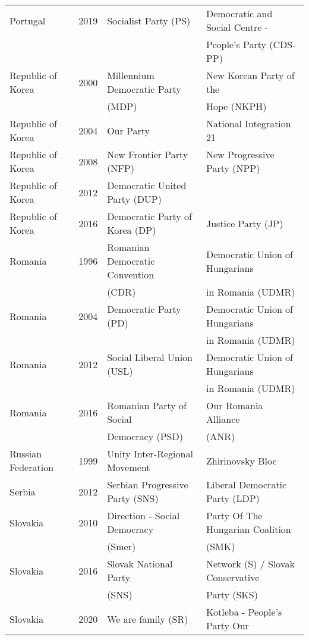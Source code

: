 {\begin{longtable}{|l|c|l|l|}
Portugal & 2019 &   Socialist Party (PS) &   Democratic and Social Centre - \\ 
               &      &         &   People's Party (CDS-PP)   \\ 
Republic of Korea & 2000 &   Millennium Democratic Party  &   New Korean Party of the \\ 
               &      &      (MDP)   &   Hope (NKPH)   \\ 
   Republic of Korea & 2004 &   Our Party &   National Integration 21 \\ 
   Republic of Korea & 2008 &   New Frontier Party (NFP)   &   New Progressive Party (NPP) \\ 
   Republic of Korea & 2012 &   Democratic United Party (DUP) &  \\ 
   Republic of Korea & 2016 &   Democratic Party of Korea (DP) &   Justice Party (JP) \\ 
   Romania & 1996 &   Romanian Democratic Convention  &   Democratic Union of Hungarians  \\ 
               &      &      (CDR)     &   in Romania (UDMR)  \\ 
   Romania & 2004 &   Democratic Party (PD) &   Democratic Union of Hungarians  \\ 
               &      &         &    in Romania (UDMR) \\ 
   Romania & 2012 &   Social Liberal Union (USL)   &   Democratic Union of Hungarians \\ 
               &      &         &   in Romania (UDMR)   \\ 
   Romania & 2016 &   Romanian Party of Social   &   Our Romania Alliance  \\ 
               &      &      Democracy (PSD)    &   (ANR)  \\ 
Russian Federation & 1999 &   Unity Inter-Regional Movement &   Zhirinovsky Bloc \\ 
 Serbia & 2012 &   Serbian Progressive Party (SNS)   &   Liberal Democratic Party (LDP)   \\ 
Slovakia & 2010 &   Direction - Social Democracy &   Party Of The Hungarian Coalition  \\ 
               &      &      (Smer)    &    (SMK) \\ 
   Slovakia & 2016 &   Slovak National Party &   Network (S) / Slovak Conservative   \\ 
               &      &      (SNS)    &    Party (SKS)  \\ 
   Slovakia & 2020 &   We are family (SR) &   Kotleba - People's Party Our    \\ 

\end{longtable}}
